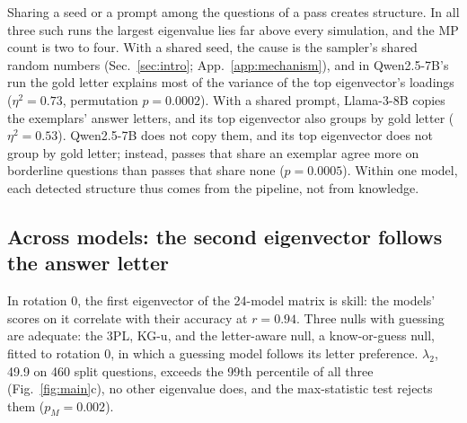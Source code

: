 \documentclass{article}
\theoremstyle{plain}
\theoremstyle{remark}
\begin{document}
Sharing a seed or a prompt among the questions of a pass creates
structure. In all three such runs the largest eigenvalue lies far above
every simulation, and the MP count is two to four.
With a shared seed, the cause is the sampler's shared random numbers
(Sec.~\ref{sec:intro}; App.~\ref{app:mechanism}), and in Qwen2.5-7B's
run the gold letter explains most of the variance of the top
eigenvector's loadings ($\eta^2=0.73$, permutation $p=0.0002$). With a
shared prompt, Llama-3-8B copies the exemplars' answer letters, and its
top eigenvector also groups by gold letter ($\eta^2=0.53$). Qwen2.5-7B
does not copy them, and its top eigenvector does not group by gold
letter; instead, passes that share an exemplar agree more on borderline
questions than passes that share none ($p=0.0005$). Within one model,
each detected structure thus comes from the pipeline, not from knowledge.

\subsection{Across models: the second eigenvector follows the answer letter}
\label{sec:across}

In rotation 0, the first eigenvector of the 24-model matrix is skill: the models' scores on it correlate with
their accuracy at $r=0.94$. Three nulls with guessing are adequate: the
3PL, KG-u, and the letter-aware null, a know-or-guess null, fitted to rotation 0, in
which a guessing model follows its letter preference. $\lambda_2$,
49.9 on 460 split questions, exceeds the 99th percentile
of all three (Fig.~\ref{fig:main}c), no other eigenvalue does, and the
max-statistic test rejects them ($p_M=0.002$).
\end{document}
